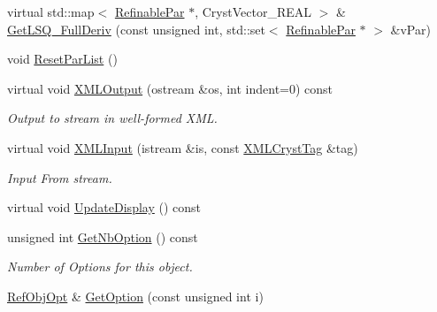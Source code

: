 \begin{DoxyCompactItemize}
\item 
virtual std\+::map$<$ \mbox{\hyperlink{class_obj_cryst_1_1_refinable_par}{Refinable\+Par}} $\ast$, Cryst\+Vector\+\_\+\+R\+E\+AL $>$ \& \mbox{\hyperlink{class_obj_cryst_1_1_refinable_obj_a83c6f2679b8dadd780e77b1f71d4cd02}{Get\+L\+S\+Q\+\_\+\+Full\+Deriv}} (const unsigned int, std\+::set$<$ \mbox{\hyperlink{class_obj_cryst_1_1_refinable_par}{Refinable\+Par}} $\ast$ $>$ \&v\+Par)
\item 
void \mbox{\hyperlink{class_obj_cryst_1_1_refinable_obj_a3b6228c6fbd154441d935af2d511fe82}{Reset\+Par\+List}} ()
\item 
virtual void \mbox{\hyperlink{class_obj_cryst_1_1_refinable_obj_a1e57fe5e669121f04f98a2518df1e99f}{X\+M\+L\+Output}} (ostream \&os, int indent=0) const
\begin{DoxyCompactList}\small\item\em Output to stream in well-\/formed X\+ML. \end{DoxyCompactList}\item 
virtual void \mbox{\hyperlink{class_obj_cryst_1_1_refinable_obj_a3e3466a6945fec22d5f371a1a1478b62}{X\+M\+L\+Input}} (istream \&is, const \mbox{\hyperlink{class_obj_cryst_1_1_x_m_l_cryst_tag}{X\+M\+L\+Cryst\+Tag}} \&tag)
\begin{DoxyCompactList}\small\item\em Input From stream. \end{DoxyCompactList}\item 
virtual void \mbox{\hyperlink{class_obj_cryst_1_1_refinable_obj_ac3164266424f984c8322f614c986f671}{Update\+Display}} () const
\item 
\mbox{\label{class_obj_cryst_1_1_refinable_obj_a2c27cf7638026ec342064e7b4c69da54}} 
unsigned int \mbox{\hyperlink{class_obj_cryst_1_1_refinable_obj_a2c27cf7638026ec342064e7b4c69da54}{Get\+Nb\+Option}} () const
\begin{DoxyCompactList}\small\item\em Number of Options for this object. \end{DoxyCompactList}\item 
\mbox{\label{class_obj_cryst_1_1_refinable_obj_a5fc27d4518a48fb526b81d8f524abb1f}} 
\mbox{\hyperlink{class_obj_cryst_1_1_ref_obj_opt}{Ref\+Obj\+Opt}} \& \mbox{\hyperlink{class_obj_cryst_1_1_refinable_obj_a5fc27d4518a48fb526b81d8f524abb1f}{Get\+Option}} (const unsigned int i)

\end{DoxyCompactItemize}
